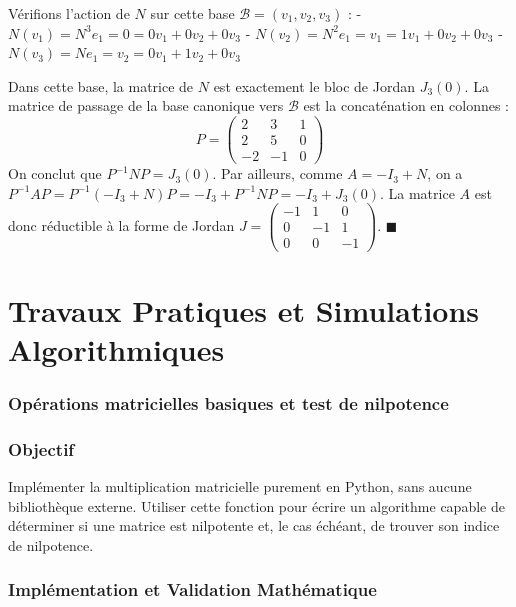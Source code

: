\documentclass[11pt,a4paper]{article}
\begin{document}
Vérifions l'action de $N$ sur cette base $\mathcal{B} = (v_1, v_2, v_3)$ :
- $N(v_1) = N^3 e_1 = 0 = 0 v_1 + 0 v_2 + 0 v_3$
- $N(v_2) = N^2 e_1 = v_1 = 1 v_1 + 0 v_2 + 0 v_3$
- $N(v_3) = N e_1 = v_2 = 0 v_1 + 1 v_2 + 0 v_3$

Dans cette base, la matrice de $N$ est exactement le bloc de Jordan $J_3(0)$.
La matrice de passage de la base canonique vers $\mathcal{B}$ est la concaténation en colonnes :
$$P = \begin{pmatrix} 2 & 3 & 1 \\ 2 & 5 & 0 \\ -2 & -1 & 0 \end{pmatrix}$$
On conclut que $P^{-1} N P = J_3(0)$.
Par ailleurs, comme $A = -I_3 + N$, on a $P^{-1} A P = P^{-1} (-I_3 + N) P = -I_3 + P^{-1} N P = -I_3 + J_3(0)$.
La matrice $A$ est donc réductible à la forme de Jordan $J = \begin{pmatrix} -1 & 1 & 0 \\ 0 & -1 & 1 \\ 0 & 0 & -1 \end{pmatrix}$. $\blacksquare$




\part{Travaux Pratiques et Simulations Algorithmiques}

\section{Opérations matricielles basiques et test de nilpotence}

\section{Objectif}
Implémenter la multiplication matricielle purement en Python, sans aucune bibliothèque externe.
Utiliser cette fonction pour écrire un algorithme capable de déterminer si une matrice est nilpotente et, le cas échéant, de trouver son indice de nilpotence.

\section{Implémentation et Validation Mathématique}
\end{document}

